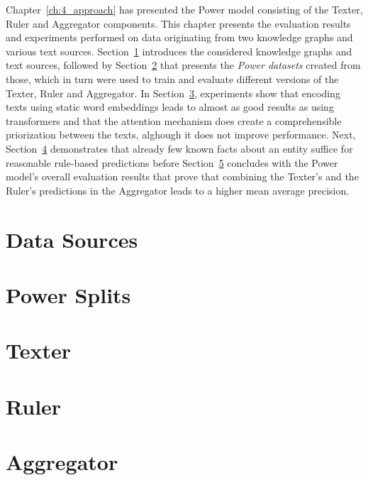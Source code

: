 Chapter~\ref{ch:4_approach} has presented the Power model consisting of the Texter, Ruler and Aggregator components. This chapter presents the evaluation results and experiments performed on data originating from two knowledge graphs and various text sources. Section~\ref{sec:5_experiments/1_data_sources} introduces the considered knowledge graphs and text sources, followed by Section~\ref{sec:5_experiments/2_power_splits} that presents the \emph{Power datasets} created from those, which in turn were used to train and evaluate different versions of the Texter, Ruler and Aggregator. In Section~\ref{sec:5_experiments/4_texter}, experiments show that encoding texts using static word embeddings leads to almost as good results as using transformers and that the attention mechanism does create a comprehensible priorization between the texts, alghough it does not improve performance. Next, Section~\ref{sec:5_experiments/5_ruler} demonstrates that already few known facts about an entity suffice for reasonable rule-based predictions before Section~\ref{sec:5_experiments/6_aggregator} concludes with the Power model's overall evaluation results that prove that combining the Texter's and the Ruler's predictions in the Aggregator leads to a higher mean average precision.


\section{Data Sources}
\label{sec:5_experiments/1_data_sources}



\section{Power Splits}
\label{sec:5_experiments/2_power_splits}



\section{Texter}
\label{sec:5_experiments/4_texter}



\section{Ruler}
\label{sec:5_experiments/5_ruler}



\section{Aggregator}
\label{sec:5_experiments/6_aggregator}

